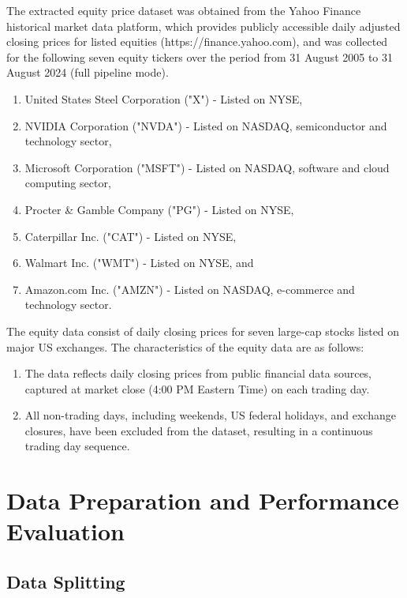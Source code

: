 \documentclass[oneside,12pt]{CUEDthesisPSnPDF}
\begin{document}
The extracted equity price dataset was obtained from the Yahoo Finance historical market data platform, which provides publicly accessible daily adjusted closing prices for listed equities (https://finance.yahoo.com), and was collected for the following seven equity tickers over the period from 31 August 2005 to 31 August 2024 (full pipeline mode).
\begin{enumerate}
    \item United States Steel Corporation ("X") - Listed on NYSE,
    \item NVIDIA Corporation ("NVDA") - Listed on NASDAQ, semiconductor and technology sector,
    \item Microsoft Corporation ("MSFT") - Listed on NASDAQ, software and cloud computing sector,
    \item Procter \& Gamble Company ("PG") - Listed on NYSE,
    \item Caterpillar Inc. ("CAT") - Listed on NYSE,
    \item Walmart Inc. ("WMT") - Listed on NYSE, and
    \item Amazon.com Inc. ("AMZN") - Listed on NASDAQ, e-commerce and technology sector.
\end{enumerate}

The equity data consist of daily closing prices for seven large-cap stocks listed on major US exchanges. The characteristics of the equity data are as follows:
\begin{enumerate}
    \item The data reflects daily closing prices from public financial data sources, captured at market close (4:00 PM Eastern Time) on each trading day.
    \item All non-trading days, including weekends, US federal holidays, and exchange closures, have been excluded from the dataset, resulting in a continuous trading day sequence.
\end{enumerate}


\section{Data Preparation and Performance Evaluation} 

\subsection{Data Splitting}
\end{document}
